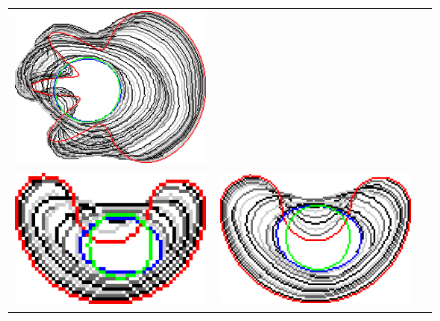 \begin{figure}[hp!]
\begin{tabular}{ccc}
	\includegraphics[scale=0.25]{figures/chapter5/flow/flower/radius_5/ii/elastica/len_pen_0.01000/jonctions_1/curve_segs_4/best/gs_0.25000/summary.pdf}\\[2em]	
	
	\includegraphics[scale=0.25]{figures/chapter5/flow/bean/radius_5/ii/elastica/len_pen_0.01000/jonctions_1/curve_segs_4/best/gs_1.00000/summary.pdf} &	 
	
	\includegraphics[scale=0.25]{figures/chapter5/flow/bean/radius_5/ii/elastica/len_pen_0.01000/jonctions_1/curve_segs_4/best/gs_0.50000/summary.pdf} &	
	

\end{tabular}
\end{figure}
